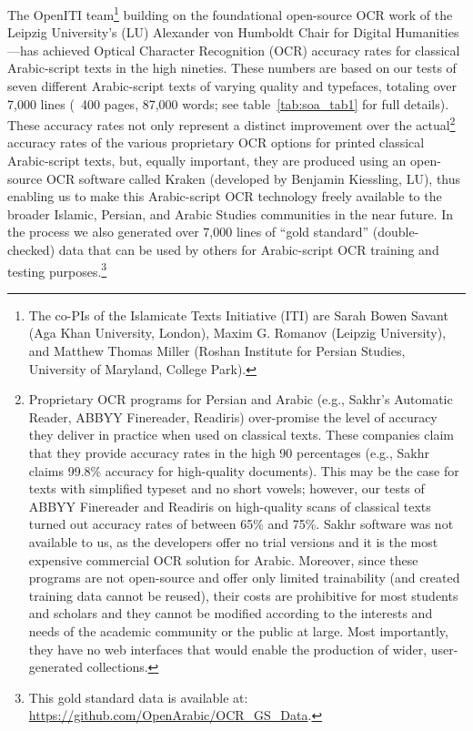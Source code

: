 The OpenITI team\footnote{The co-PIs of the Islamicate Texts Initiative (ITI)
are Sarah Bowen Savant (Aga Khan University, London), Maxim G. Romanov (Leipzig
University), and Matthew Thomas Miller (Roshan Institute for Persian Studies,
University of Maryland, College Park).} building on the foundational
open-source OCR work of the Leipzig University’s (LU) Alexander von Humboldt
Chair for Digital Humanities—has achieved Optical Character Recognition (OCR)
accuracy rates for classical Arabic-script texts in the high nineties. These
numbers are based on our tests of seven different Arabic-script texts of
varying quality and typefaces, totaling over 7,000 lines (~400 pages, 87,000
words; see table~\ref{tab:soa_tab1} for full details). These accuracy rates not
only represent a distinct improvement over the actual\footnote{Proprietary OCR
programs for Persian and Arabic (e.g., Sakhr’s Automatic Reader, ABBYY
Finereader, Readiris) over-promise the level of accuracy they deliver in
practice when used on classical texts. These companies claim that they provide
accuracy rates in the high 90 percentages (e.g., Sakhr claims 99.8\% accuracy
for high-quality documents). This may be the case for texts with simplified
typeset and no short vowels; however, our tests of ABBYY Finereader and
Readiris on high-quality scans of classical texts turned out accuracy rates of
between 65\% and 75\%.  Sakhr software was not available to us, as the
developers offer no trial versions and it is the most expensive commercial OCR
solution for Arabic.  Moreover, since these programs are not open-source and
offer only limited trainability (and created training data cannot be reused),
their costs are prohibitive for most students and scholars and they cannot be
modified according to the interests and needs of the academic community or the
public at large. Most importantly, they have no web interfaces that would
enable the production of wider, user-generated collections.} accuracy rates of
the various proprietary OCR options for printed classical Arabic-script texts,
but, equally important, they are produced using an open-source OCR software
called Kraken (developed by Benjamin Kiessling, LU), thus enabling us to make
this Arabic-script OCR technology freely available to the broader Islamic,
Persian, and Arabic Studies communities in the near future. In the process we
also generated over 7,000 lines of “gold standard” (double-checked) data that
can be used by others for Arabic-script OCR training and testing
purposes.\footnote{This gold standard data is available at:
\url{https://github.com/OpenArabic/OCR_GS_Data}.}


